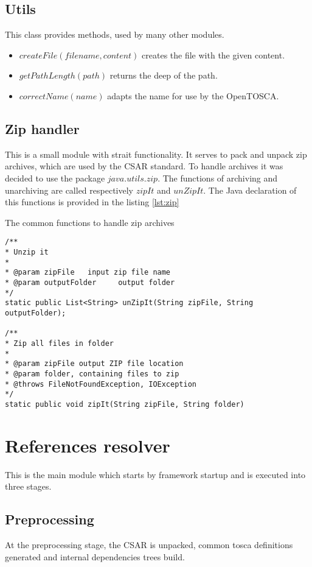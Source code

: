 \subsection*{Utils}
This class provides methods, used by many other modules.
\begin{itemize}
	\item $createFile(filename, content)$ creates the file with the given content.
	\item $getPathLength(path)$ returns the deep of the path.
	\item $correctName(name)$ adapts the name for use by the OpenTOSCA.
\end{itemize}

\subsection*{Zip handler}
This is a small module with strait functionality. 
It serves to pack and unpack zip archives, which are used by the CSAR standard.
To handle archives it was decided to use the package $java$.$utils$.$zip$.
The functions of archiving and unarchiving are called respectively $zipIt$ and $unZipIt$. The Java declaration of this functions is provided in the listing \ref{lst:zip}
\begin{Listing}
\caption{The common functions to handle zip archives}
\label{lst:zip}
\begin{lstlisting}
/**
* Unzip it
* 
* @param zipFile   input zip file name
* @param outputFolder     output folder
*/ 
static public List<String> unZipIt(String zipFile, String outputFolder);

/**
* Zip all files in folder
* 
* @param zipFile output ZIP file location
* @param folder, containing files to zip
* @throws FileNotFoundException, IOException
*/
static public void zipIt(String zipFile, String folder)
\end{lstlisting}
\end{Listing}

\section{References resolver}
This is the main module which starts by framework startup and is executed into three stages.

\subsection*{Preprocessing}
At the preprocessing stage, the CSAR is unpacked, common \gls{tosca} definitions generated and internal dependencies trees build. 

